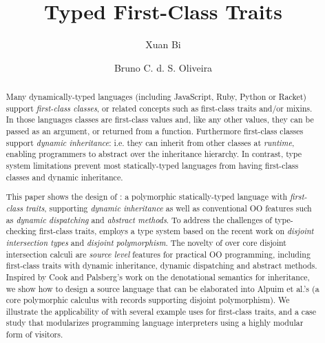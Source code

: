 \documentclass[a4paper,UKenglish]{lipics-v2018}
\title{Typed First-Class Traits}
\author{Xuan Bi}{The University of Hong Kong, Hong Kong, China}{xbi@cs.hku.hk}{}{}%
\author{Bruno C. d. S. Oliveira}{The University of Hong Kong, Hong Kong, China}{bruno@cs.hku.hk}{}{}
\begin{document}
\maketitle

\begin{abstract}
Many dynamically-typed languages (including JavaScript, Ruby, Python
or Racket) support \emph{first-class classes}, or related concepts
such as first-class traits and/or mixins. In those languages classes
are first-class values and, like any other values, they can be
passed as an argument, or returned from a function. Furthermore
first-class classes support \emph{dynamic inheritance}: i.e. they
can inherit from other classes at \emph{runtime}, enabling
programmers to abstract over the inheritance hierarchy. In contrast,
type system limitations prevent most
statically-typed languages from having first-class classes and
dynamic inheritance.

This paper shows the design of \name: a polymorphic statically-typed
language with \emph{first-class traits}, supporting \emph{dynamic
  inheritance} as well as conventional OO features such as
\emph{dynamic dispatching} and \emph{abstract methods}.  To address
the challenges of type-checking first-class traits, \name employs a type
system based on the recent work on \emph{disjoint
  intersection types} and \emph{disjoint polymorphism}. The novelty of
\name over core disjoint intersection calculi are \emph{source level} features for
practical OO programming, including first-class traits with dynamic inheritance, dynamic
dispatching and abstract methods. Inspired by Cook and Palsberg's work on the
denotational semantics for inheritance, we show how to design a source
language that can be elaborated into Alpuim et al.'s \bname
(a core polymorphic calculus with records supporting disjoint polymorphism).
We illustrate the applicability of \name with several example uses for
first-class traits, and a case study that modularizes programming
language interpreters using a highly modular form of visitors.

\begin{comment}
To allow for \emph{dynamic dispatching} \name
uses

Traits pose additional challenges when compared to
models with first-class classes or mixins, because method conflicts
should be detected \emph{statically}. To enable such dynamic
composition of traits, even when traits are \emph{polymorphic},
SEDEL's type system is based on \emph{disjoint intersection types} and
\emph{disjoint polymorphism}. Inspired by Cook's denotational
semantics of inheritance, this work shows how to develop a source
language.


\end{comment}
\end{abstract}
\end{document}
